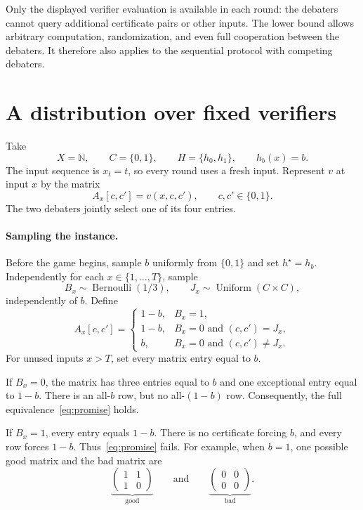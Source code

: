 \documentclass[11pt]{article}
\newcommand{\N}{\mathbb{N}}
\theoremstyle{remark}
\begin{document}
Only the displayed verifier evaluation is available in each round: the
debaters cannot query additional certificate pairs or other inputs. The lower
bound allows arbitrary computation, randomization, and even full cooperation
between the debaters. It therefore also applies to the sequential protocol
with competing debaters.

\section{A distribution over fixed verifiers}\label{sec:construction}

Take
\[
    X=\N,\qquad C=\{0,1\},\qquad H=\{h_0,h_1\},
    \qquad h_b(x)=b.
\]
The input sequence is $x_t=t$, so every round uses a fresh input. Represent
$v$ at input $x$ by the matrix
\[
    A_x[c,c']=v(x,c,c'),\qquad c,c'\in\{0,1\}.
\]
The two debaters jointly select one of its four entries.

\paragraph{Sampling the instance.}
Before the game begins, sample $b$ uniformly from $\{0,1\}$ and set
$h^\star=h_b$. Independently for each $x\in\{1,\ldots,T\}$, sample
\[
 B_x\sim\operatorname{Bernoulli}(1/3),
 \qquad J_x\sim\operatorname{Uniform}(C\times C),
\]
independently of $b$. Define
\begin{equation}\label{eq:matrix-rule}
 A_x[c,c'] =
 \begin{cases}
     1-b, & B_x=1,\\
     1-b, & B_x=0\text{ and }(c,c')=J_x,\\
     b,   & B_x=0\text{ and }(c,c')\ne J_x.
 \end{cases}
\end{equation}
For unused inputs $x>T$, set every matrix entry equal to $b$.

If $B_x=0$, the matrix has three entries equal to $b$ and one exceptional
entry equal to $1-b$. There is an all-$b$ row, but no all-$(1-b)$ row.
Consequently, the full equivalence~\eqref{eq:promise} holds.

If $B_x=1$, every entry equals $1-b$. There is no certificate forcing $b$,
and every row forces $1-b$. Thus~\eqref{eq:promise} fails. For example, when
$b=1$, one possible good matrix and the bad matrix are
\[
 \underbrace{\begin{pmatrix}1&1\\1&0\end{pmatrix}}_{\text{good}}
 \qquad\text{and}\qquad
 \underbrace{\begin{pmatrix}0&0\\0&0\end{pmatrix}}_{\text{bad}}.
\]
\end{document}
